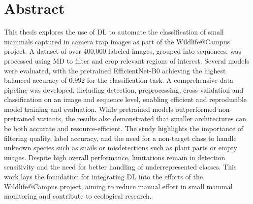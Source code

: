 

\section*{Abstract}
\label{abstract}

This thesis explores the use of \ac{DL} to automate the classification of small mammals captured in camera trap images as part of the Wildlife@Campus project.
A dataset of over 400,000 labeled images, grouped into sequences, was processed using \acl{MD} to filter and crop relevant regions of interest.
Several models were evaluated, with the pretrained EfficientNet-B0 achieving the highest balanced accuracy of \(0.992\) for the classification task.
A comprehensive data pipeline was developed, including detection, preprocessing, cross-validation and classification on an image and sequence level, enabling efficient and reproducible model training and evaluation.
While pretrained models outperformed non-pretrained variants, the results also demonstrated that smaller architectures can be both accurate and resource-efficient.
The study highlights the importance of filtering quality, label accuracy, and the need for a non-target class to handle unknown species such as snails or misdetections such as plant parts or empty images.
Despite high overall performance, limitations remain in detection sensitivity and the need for better handling of underrepresented classes.
This work lays the foundation for integrating \ac{DL} into the efforts of the Wildlife@Campus project, aiming to reduce manual effort in small mammal monitoring and contribute to ecological research.

